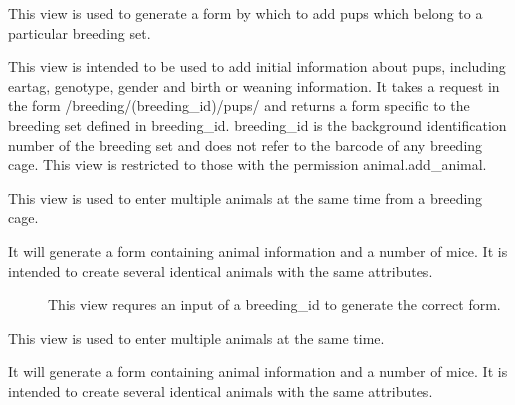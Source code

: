 \documentclass[letterpaper,10pt,english]{sphinxmanual}
\begin{document}

\begin{fulllineitems}
\label{api:animal.views.breeding_pups}
This view is used to generate a form by which to add pups which belong to a particular breeding set.

This view is intended to be used to add initial information about pups, including eartag, genotype, gender and birth or weaning information.
It takes a request in the form /breeding/(breeding\_id)/pups/ and returns a form specific to the breeding set defined in breeding\_id.  breeding\_id is the background identification number of the breeding set and does not refer to the barcode of any breeding cage.
This view is restricted to those with the permission animal.add\_animal.

\end{fulllineitems}


\begin{fulllineitems}
\label{api:animal.views.multiple_breeding_pups}
This view is used to enter multiple animals at the same time from a breeding cage.
\begin{description}
\item[{It will generate a form containing animal information and a number of mice.  It is intended to create several identical animals with the same attributes.}] \leavevmode
This view requres an input of a breeding\_id to generate the correct form.

\end{description}

\end{fulllineitems}


\begin{fulllineitems}
\label{api:animal.views.multiple_pups}
This view is used to enter multiple animals at the same time.

It will generate a form containing animal information and a number of mice.  It is intended to create several identical animals with the same attributes.

\end{fulllineitems}
\end{document}
